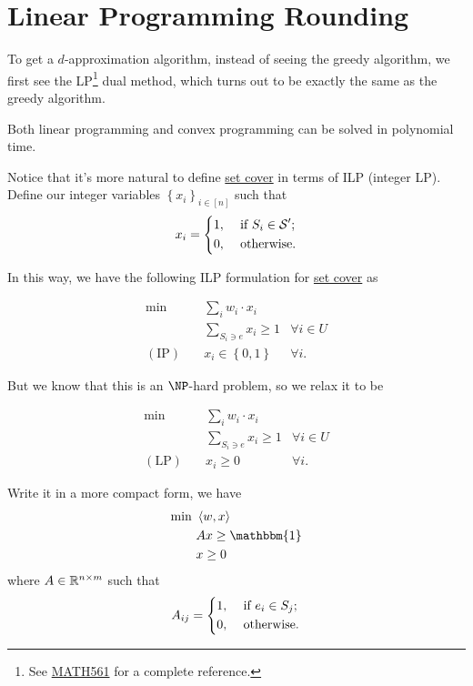 
\section{Linear Programming Rounding}

To get a \(d\)-approximation algorithm, instead of seeing the greedy algorithm, we first see the LP\footnote{See \href{https://www.pbb.wtf/posts/Notes\#linear-programming-math561ioe510to518-umich}{MATH561} for a complete reference.} dual method, which turns out to be exactly the same as the greedy algorithm.

\begin{prev}
	Both linear programming and convex programming can be solved in polynomial time.
\end{prev}

Notice that it's more natural to define \hyperref[prb:set-cover]{set cover} in terms of ILP (integer LP). Define our integer variables \(\left\{ x_i \right\} _{i\in [n]}\) such that
\[
	x_i = \begin{dcases}
		1, & \text{ if } S_i\in \mathcal{\MakeUppercase{S}} ^\prime  ; \\
		0, & \text{ otherwise}.
	\end{dcases}
\]

In this way, we have the following ILP formulation for \hyperref[prb:set-cover]{set cover} as

\begin{align*}
	\min~            & \sum_{i} w_i \cdot x_i                           \\
	                 & \sum_{S_i\ni e}x_{i} \geq 1     & \forall i\in U \\
	(\text{IP})\quad & x_{i} \in \left\{ 0, 1 \right\} & \forall i.
\end{align*}

But we know that this is an \(\NP\)-hard problem, so we relax it to be

\begin{align*}
	\min~            & \sum_{i} w_i \cdot x_i                       \\
	                 & \sum_{S_i\ni e}x_{i} \geq 1 & \forall i\in U \\
	(\text{LP})\quad & x_{i} \geq 0                & \forall i.
\end{align*}

Write it in a more compact form, we have
\begin{align*}
	\min~ & \left\langle w, x \right\rangle \\
	      & Ax \geq \mathbbm{1}             \\
	      & x\geq 0
\end{align*}
where \(A\in \mathbb{\MakeUppercase{r}} ^{n\times m}\) such that
\[
	A_{ij} = \begin{dcases}
		1, & \text{ if } e_i\in S_j ; \\
		0, & \text{ otherwise}.
	\end{dcases}
\]

